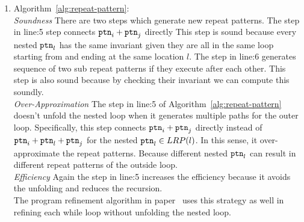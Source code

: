 \begin{enumerate}
  \item
Algorithm~\ref{alg:repeat-pattern}:
\\
\emph{Soundness}
There are two steps which generate new repeat patterns.
The step in line:5 step connects  $\mathtt{ptn}_i +\mathtt{ptn}_j$ directly
This step is sound because every nested $\mathtt{ptn}_l$
has the same invariant given they are all in the same loop starting from and ending at the same location $l$.
The step in line:6 generates sequence of two sub repeat patterns if they execute after each other.
This step is also sound because by checking their invariant we can compute this soundly.
\\
\emph{Over-Approximation}
The step in line:5 of Algorithm~\ref{alg:repeat-pattern} doesn't unfold the nested loop when it generates multiple paths for the outer loop.
Specifically, this step connects  $\mathtt{ptn}_i +\mathtt{ptn}_j$ directly
instead of $\mathtt{ptn}_i + \mathtt{ptn}_l + \mathtt{ptn}_j$ for the nested $\mathtt{ptn}_l \in LRP(l)$. 
In this sense, it over-approximate the repeat patterns.
Because different nested $\mathtt{ptn}_l$ can result in different repeat patterns of the outside loop.
\\
\emph{Efficiency}
Again the step in line:5 increases the efficiency because it avoids the unfolding and reduces  the recursion.
\\
The program refinement algorithm in paper~\cite{GulwaniJK09} uses this strategy as well in refining each while loop without unfolding the nested loop.

\end{enumerate}
